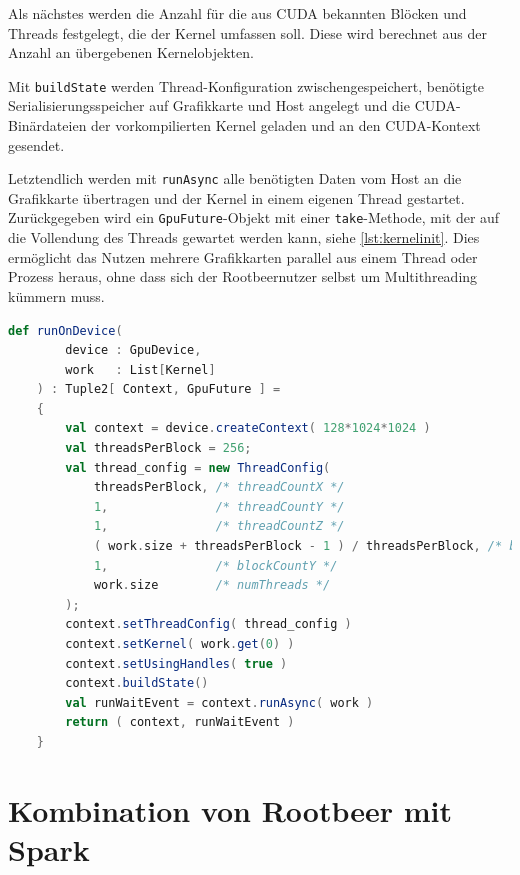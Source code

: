 Als nächstes werden die Anzahl für die aus CUDA bekannten Blöcken und Threads festgelegt, die der Kernel umfassen soll. Diese wird berechnet aus der Anzahl an übergebenen Kernelobjekten.

Mit \lstinline!buildState! werden Thread-Konfiguration zwischengespeichert, benötigte Serialisierungsspeicher auf Grafikkarte und Host angelegt und die CUDA-Binärdateien der vorkompilierten Kernel geladen und an den CUDA-Kontext gesendet.

Letztendlich werden mit \lstinline!runAsync! alle benötigten Daten vom Host an die Grafikkarte übertragen und der Kernel in einem eigenen Thread gestartet. Zurückgegeben wird ein \lstinline!GpuFuture!-Objekt mit einer \lstinline!take!-Methode, mit der auf die Vollendung des Threads gewartet werden kann, siehe \autoref{lst:kernelinit}. Dies ermöglicht das Nutzen mehrere Grafikkarten parallel aus einem Thread oder Prozess heraus, ohne dass sich der Rootbeernutzer selbst um Multithreading kümmern muss.

\begin{lstlisting}[language=scala,caption={Ausführen der Rootbeerkernels auf einer ausgewählten Grafikkarte, vgl. auch \lstinline!multiNode/multiGpu/scala/MonteCarloPi.scala! \cite{scaromare}},label=lst:kernelcall]
    def runOnDevice(
        device : GpuDevice,
        work   : List[Kernel]
    ) : Tuple2[ Context, GpuFuture ] =
    {
        val context = device.createContext( 128*1024*1024 )
        val threadsPerBlock = 256;
        val thread_config = new ThreadConfig(
            threadsPerBlock, /* threadCountX */
            1,               /* threadCountY */
            1,               /* threadCountZ */
            ( work.size + threadsPerBlock - 1 ) / threadsPerBlock, /* blockCountX */
            1,               /* blockCountY */
            work.size        /* numThreads */
        );
        context.setThreadConfig( thread_config )
        context.setKernel( work.get(0) )
        context.setUsingHandles( true )
        context.buildState()
        val runWaitEvent = context.runAsync( work )
        return ( context, runWaitEvent )
    }
\end{lstlisting}


\section{Kombination von Rootbeer mit Spark}


